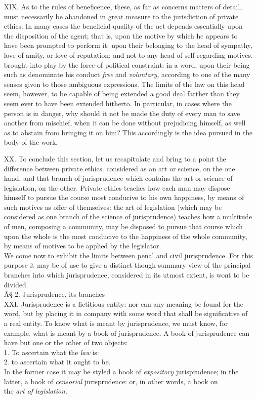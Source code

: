 \documentclass[12pt]{report}
\begin{document}
XIX. As to the rules of beneficence, these, as far as concerns matters
of detail, must necessarily be abandoned in great measure to the
jurisdiction of private ethics. In many cases the beneficial quality of
the act depends essentially upon the disposition of the agent; that is,
upon the motive by which he appears to have been prompted to perform it:
upon their belonging to the head of sympathy, love of amity, or love of
reputation; and not to any head of self-regarding motives. brought into
play by the force of political constraint: in a word, upon their being
such as denominate his conduct \emph{free} and \emph{voluntary,}
according to one of the many senses given to those ambiguous
expressions. The limits of the law on this head seem, however, to be
capable of being extended a good deal farther than they seem ever to
have been extended hitherto. In particular, in cases where the person is
in danger, why should it not be made the duty of every man to save
another from mischief, when it can be done without prejudicing himself,
as well as to abstain from bringing it on him? This accordingly is the
idea pursued in the body of the work.

XX. To conclude this section, let us recapitulate and bring to a point
the difference between private ethics. considered as an art or science,
on the one hand, and that branch of jurisprudence which contains the art
or science of legislation, on the other. Private ethics teaches how each
man may dispose himself to pursue the course most conducive to his own
happiness, by means of such motives as offer of themselves: the art of
legislation (which may be considered as one branch of the science of
jurisprudence) teaches how a multitude of men, composing a community,
may be disposed to pursue that course which upon the whole is the most
conducive to the happiness of the whole community, by means of motives
to be applied by the legislator.\\
We come now to exhibit the limits between penal and civil jurisprudence.
For this purpose it may be of use to give a distinct though summary view
of the principal branches into which jurisprudence, considered in its
utmost extent, is wont to be divided.\\

Â§ 2. Jurisprudence, its branches\\
XXI. Jurisprudence is a fictitious entity: nor can any meaning be found
for the word, but by placing it in company with some word that shall be
significative of a real entity. To know what is meant by jurisprudence,
we must know, for example, what is meant by a book of jurisprudence. A
book of jurisprudence can have but one or the other of two objects:\\
1. To ascertain what the \emph{law} is:\\
2. to ascertain what it ought to be.\\
In the former case it may be styled a book of \emph{expository}
jurisprudence; in the latter, a book of \emph{censorial} jurisprudence:
or, in other words, a book on\\
the \emph{art of legislation.}
\end{document}
